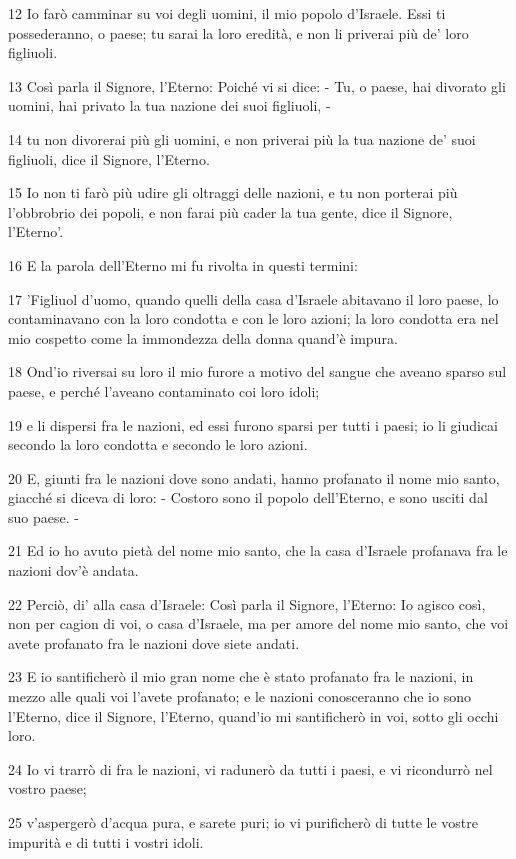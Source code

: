 \par 12 Io farò camminar su voi degli uomini, il mio popolo d'Israele. Essi ti possederanno, o paese; tu sarai la loro eredità, e non li priverai più de' loro figliuoli.
\par 13 Così parla il Signore, l'Eterno: Poiché vi si dice: - Tu, o paese, hai divorato gli uomini, hai privato la tua nazione dei suoi figliuoli, -
\par 14 tu non divorerai più gli uomini, e non priverai più la tua nazione de' suoi figliuoli, dice il Signore, l'Eterno.
\par 15 Io non ti farò più udire gli oltraggi delle nazioni, e tu non porterai più l'obbrobrio dei popoli, e non farai più cader la tua gente, dice il Signore, l'Eterno'.
\par 16 E la parola dell'Eterno mi fu rivolta in questi termini:
\par 17 'Figliuol d'uomo, quando quelli della casa d'Israele abitavano il loro paese, lo contaminavano con la loro condotta e con le loro azioni; la loro condotta era nel mio cospetto come la immondezza della donna quand'è impura.
\par 18 Ond'io riversai su loro il mio furore a motivo del sangue che aveano sparso sul paese, e perché l'aveano contaminato coi loro idoli;
\par 19 e li dispersi fra le nazioni, ed essi furono sparsi per tutti i paesi; io li giudicai secondo la loro condotta e secondo le loro azioni.
\par 20 E, giunti fra le nazioni dove sono andati, hanno profanato il nome mio santo, giacché si diceva di loro: - Costoro sono il popolo dell'Eterno, e sono usciti dal suo paese. -
\par 21 Ed io ho avuto pietà del nome mio santo, che la casa d'Israele profanava fra le nazioni dov'è andata.
\par 22 Perciò, di' alla casa d'Israele: Così parla il Signore, l'Eterno: Io agisco così, non per cagion di voi, o casa d'Israele, ma per amore del nome mio santo, che voi avete profanato fra le nazioni dove siete andati.
\par 23 E io santificherò il mio gran nome che è stato profanato fra le nazioni, in mezzo alle quali voi l'avete profanato; e le nazioni conosceranno che io sono l'Eterno, dice il Signore, l'Eterno, quand'io mi santificherò in voi, sotto gli occhi loro.
\par 24 Io vi trarrò di fra le nazioni, vi radunerò da tutti i paesi, e vi ricondurrò nel vostro paese;
\par 25 v'aspergerò d'acqua pura, e sarete puri; io vi purificherò di tutte le vostre impurità e di tutti i vostri idoli.
